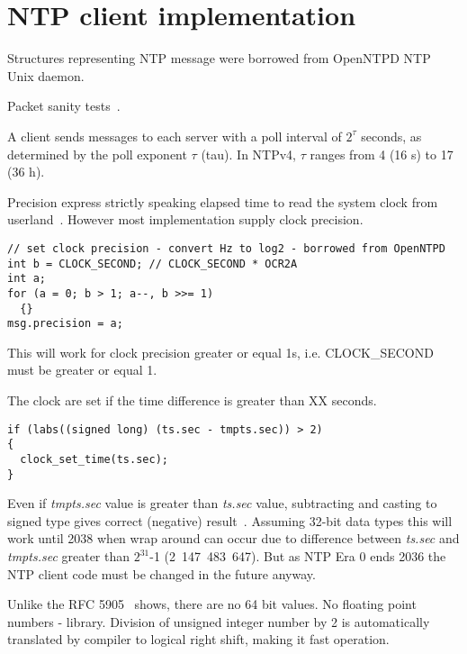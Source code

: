 
\section{NTP client implementation}
Structures representing NTP message were borrowed from OpenNTPD NTP Unix daemon.

Packet sanity tests~\cite{ntp-arch}.

A client sends messages to each server with a poll interval of $2^{\tau}$
seconds, as determined by the poll exponent $\tau$ (tau).
In NTPv4, $\tau$ ranges from 4 (16 s) to 17 (36 h).


Precision express strictly speaking elapsed time to read the system clock from userland~\cite{ntp-arch}.
However most implementation supply clock precision.
\begin{lstlisting}
// set clock precision - convert Hz to log2 - borrowed from OpenNTPD
int b = CLOCK_SECOND; // CLOCK_SECOND * OCR2A
int a;
for (a = 0; b > 1; a--, b >>= 1)
  {}
msg.precision = a;
\end{lstlisting}
This will work for clock precision greater or equal 1s, i.e. CLOCK\_SECOND must be greater or equal 1.

The clock are set if the time difference is greater than XX seconds. %
\begin{lstlisting}
if (labs((signed long) (ts.sec - tmpts.sec)) > 2)
{
  clock_set_time(ts.sec);
}
\end{lstlisting}
Even if {\it{tmpts.sec}} value is greater than {\it{ts.sec}} value,
subtracting and casting to signed type gives correct (negative) result~\cite{c99}.
Assuming 32-bit data types this will work until 2038 when wrap around can occur due to difference
between {\it{ts.sec}} and {\it{tmpts.sec}} greater than $2^{31}$-1 (2~147~483~647).
But as NTP Era 0 ends 2036 the NTP client code must be changed in the future anyway.



Unlike the RFC 5905~\cite{rfc5905} shows, there are no 64 bit values. %
No floating point numbers - library.
Division of unsigned integer number by 2 is automatically translated by compiler to logical right shift,
making it fast operation.

